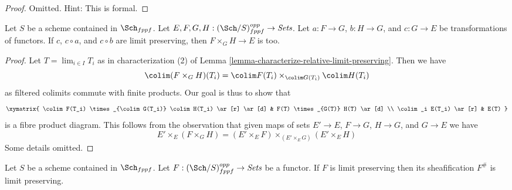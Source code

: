 \begin{proof}
Omitted. Hint: This is formal.
\end{proof}

\begin{lemma}
\label{lemma-fibre-product-locally-finite-presentation}
Let $S$ be a scheme contained in $\Sch_{fppf}$.
Let $E, F, G, H : (\Sch/S)_{fppf}^{opp} \to \textit{Sets}$.
Let $a : F \to G$, $b : H \to G$, and $c : G \to E$
be transformations of functors. If $c$, $c \circ a$, and $c \circ b$
are limit preserving, then $F \times_G H \to E$ is too.
\end{lemma}

\begin{proof}
Let $T = \lim_{i \in I} T_i$ as in characterization (2) of
Lemma \ref{lemma-characterize-relative-limit-preserving}.
Then we have
$$
\colim (F \times_G H)(T_i) =
\colim F(T_i) \times_{\colim G(T_i)} \colim H(T_i)
$$
as filtered colimits commute with finite products. Our goal is thus to
show that
$$
\xymatrix{
\colim F(T_i) \times_{\colim G(T_i)} \colim H(T_i) \ar[r] \ar[d] &
F(T) \times_{G(T)} H(T) \ar[d] \\
\colim_i E(T_i) \ar[r] & E(T)
}
$$
is a fibre product diagram. This follows from the observation that
given maps of sets $E' \to E$, $F \to G$, $H \to G$, and $G \to E$
we have
$$
E' \times_E (F \times_G H) =
(E' \times_E F) \times_{(E' \times_E G)} (E' \times_E H)
$$
Some details omitted.
\end{proof}

\begin{lemma}
\label{lemma-sheafify-finite-presentation}
Let $S$ be a scheme contained in $\Sch_{fppf}$.
Let $F : (\Sch/S)_{fppf}^{opp} \to \textit{Sets}$ be a functor.
If $F$ is limit preserving then its sheafification $F^\#$ is limit preserving.
\end{lemma}

